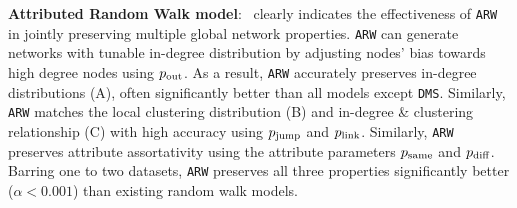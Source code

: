 \textbf{Attributed Random Walk model}:~ clearly indicates the effectiveness
of \texttt{ARW} in {jointly} preserving multiple
global network properties. \texttt{ARW} can generate networks with tunable
in-degree distribution by adjusting nodes' bias towards high degree nodes
using $p_{\scriptsize\mbox{out}}$. As a result, \texttt{ARW} accurately preserves
in-degree distributions (A), often significantly better
than all models except \texttt{DMS}. Similarly, \texttt{ARW} matches the local clustering
distribution  (B) and in-degree \& clustering relationship
(C) with high accuracy using $p_{\scriptsize\mbox{jump}}$ and
$p_{\scriptsize\mbox{link}}$. Similarly, \texttt{ARW} preserves attribute assortativity using
the attribute parameters $p_{\scriptsize\mbox{same}}$ and $p_{\scriptsize\mbox{diff}}$.
Barring one to two datasets, \texttt{ARW} preserves all three properties significantly
better ($\alpha < 0.001$) than existing random walk models.





